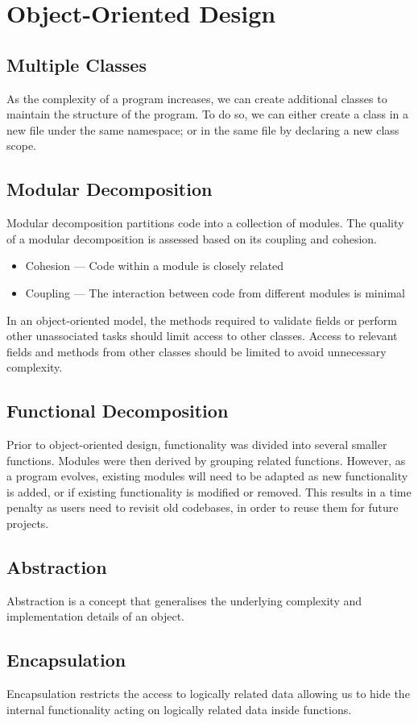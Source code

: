\documentclass{article}
\begin{document}
\section{Object-Oriented Design}
\subsection{Multiple Classes}
As the complexity of a program increases, we can create additional
classes to maintain the structure of the program. To do so, we can
either create a class in a new file under the same namespace; or in the
same file by declaring a new class scope.
\subsection{Modular Decomposition}
Modular decomposition partitions code into a collection of modules. The
quality of a modular decomposition is assessed based on its coupling
and cohesion.
\begin{itemize}
    \item Cohesion --- Code within a module is closely related
    \item Coupling --- The interaction between code from different
          modules is minimal
\end{itemize}
In an object-oriented model, the methods required to validate fields or perform other
unassociated tasks should limit access to other classes.
Access to relevant fields and methods from other classes should be
limited to avoid unnecessary complexity.
\subsection{Functional Decomposition}
Prior to object-oriented design, functionality was divided into several
smaller functions. Modules were then derived by grouping related
functions. However, as a program evolves, existing modules will need to
be adapted as new functionality is added, or if existing functionality
is modified or removed. This results in a time penalty as users need to
revisit old codebases, in order to reuse them for future projects.
\subsection{Abstraction}
Abstraction is a concept that generalises the underlying complexity and
implementation details of an object.
\subsection{Encapsulation}
Encapsulation restricts the access to logically related data allowing
us to hide the internal \linebreak functionality acting on logically
related data inside functions.
\end{document}
